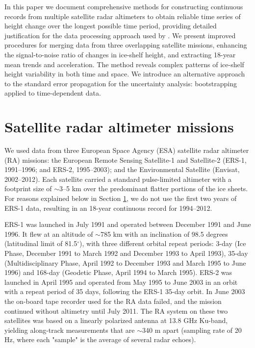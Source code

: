 In this paper we document comprehensive methods for constructing continuous records from multiple satellite radar altimeters to obtain reliable time series of height change over the longest possible time period, providing detailed justification for the data processing approach used by \textcite{Paolo2015}. We present improved procedures for merging data from three overlapping satellite missions, enhancing the signal-to-noise ratio of changes in ice-shelf height, and extracting 18-year mean trends and acceleration. The method reveals complex patterns of ice-shelf height variability in both time and space. We introduce an alternative approach to the standard error propagation for the uncertainty analysis: bootstrapping applied to time-dependent data. 

\section{Satellite radar altimeter missions}
\label{sat-ra}

We used data from three European Space Agency (ESA) satellite radar altimeter (RA) missions: the European Remote Sensing Satellite-1 and Satellite-2 (ERS-1, 1991--1996; and ERS-2, 1995--2003); and the Environmental Satellite (Envisat, 2002--2012). Each satellite carried a standard pulse-limited altimeter with a footprint size of $\sim$3--5 km over the predominant flatter portions of the ice sheets. For reasons explained below in Section \ref{sat-ra}, we do not use the first two years of ERS-1 data, resulting in an 18-year continuous record for 1994--2012.

ERS-1 was launched in July 1991 and operated between December 1991 and June 1996. It flew at an altitude of $\sim$785 km with an inclination of 98.5 degrees (latitudinal limit of 81.5$^\circ$), with three different orbital repeat periods: 3-day (Ice Phase, December 1991 to March 1992 and December 1993 to April 1993), 35-day (Multidisciplinary Phase, April 1992 to December 1993 and March 1995 to June 1996) and 168-day (Geodetic Phase, April 1994 to March 1995). ERS-2 was launched in April 1995 and operated from May 1995 to June 2003 in an orbit with a repeat period of 35 days, following the ERS-1 35-day orbit. In June 2003 the on-board tape recorder used for the RA data failed, and the mission continued without altimetry until July 2011. The RA system on these two satellites was based on a linearly polarized antenna at 13.8 GHz Ku-band, yielding along-track measurements that are $\sim$340 m apart (sampling rate of 20 Hz, where each "sample" is the average of several radar echoes).

